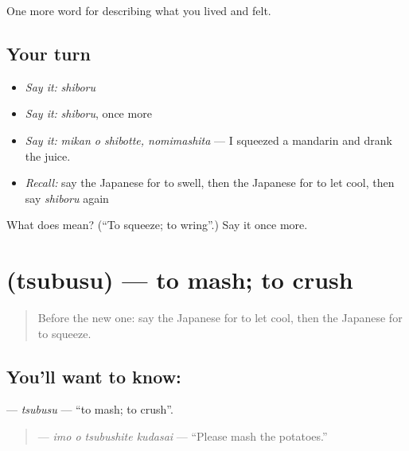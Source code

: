 \begin{grammarlens}[title={What you've built}]
One more word for describing what you lived and felt.
\end{grammarlens}

\subsection*{Your turn}
\begin{itemize}
\raggedright
  \item \emph{Say it:} \emph{shiboru}
  \item \emph{Say it:} \emph{shiboru}, once more
  \item \emph{Say it:} \emph{mikan o shibotte, nomimashita} — I squeezed a mandarin and drank the juice.
  \item \emph{Recall:} say the Japanese for to swell, then the Japanese for to let cool, then say \emph{shiboru} again
\end{itemize}

\begin{tcolorbox}[breakable,colback=teal!4,colframe=teal!35!black,title={Before you move on}]
What does  mean? (\textquotedblleft{}To squeeze; to wring\textquotedblright{}.) Say it once more.
\end{tcolorbox}
\section[\texorpdfstring{\ja{つぶす} (tsubusu)}{つぶす (tsubusu)}]{ (tsubusu) — to mash; to crush}

\label{lesson:JA-C474-tsubusu}



\begin{quote}
Before the new one: say the Japanese for to let cool, then the Japanese for to squeeze.
\end{quote}

\subsection*{You'll want to know: }
\textbf{} — \emph{tsubusu} — \textquotedblleft{}to mash; to crush\textquotedblright{}.

\begin{quote}
\textbf{  } — \emph{imo o tsubushite kudasai} — \textquotedblleft{}Please mash the potatoes.\textquotedblright{}
\end{quote}

